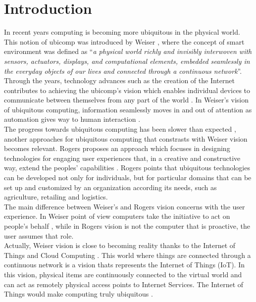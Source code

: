 \section{Introduction}
\label{sec:introduction}
In recent years computing is becoming more ubiquitous in the physical world. This
notion of ubicomp was introduced by Weiser \cite{weiser1999origins}, where the concept of
smart environment was defined as ``\textit{a physical world richly and invisibly
interwoven with sensors, actuators, displays, and computational elements, embedded
seamlessly in the everyday objects of our lives and connected through a continuous network}''.
Through the years, technology advances such as the creation of the Internet contributes
to achieving the ubicomp's vision which enables individual devices to communicate between
themselves from any part of the world \cite{gubbi2013internet}. In Weiser's vision of
ubiquitous computing, information seamlessly moves in and out of attention as automation
gives way to human interaction \cite{weiser1991computer}.\\

The progress towards ubiquitous computing has been slower than expected \cite{greenfield2010everyware},
another approaches for ubiquitous computing that constrasts with Weiser vision becomes relevant.
Rogers proposes an approach which focuses in designing technologies for engaging user
experiences that, in a creative and constructive way, extend the peoples' capabilities \cite{rogers2006moving}.
Rogers points that ubiquitous technologies can be developed not only for individuals,
but for particular domains that can be set up and customized by an organization according
its needs, such as agriculture, retailing and logistics.\\

The main difference between Weiser's and Rogers vision concerns with the user experience.
In Weiser point of view computers take the initiative to act on people's behalf \cite{tennenhouse2000proactive},
while in Rogers vision is not the computer that is proactive, the user assumes that role.\\

Actually, Weiser vision is close to becoming reality thanks to the Internet of Things
and Cloud Computing \cite{caceres2012ubicomp}. This world where things are connected
through a continuous network is a vision thats represents the Internet of Things (IoT).
In this vision, physical items are continuously connected to the virtual world and can
act as remotely physical access points to Internet Services. The Internet of Things would
make computing truly ubiquitous \cite{mattern2010internet}.\\

